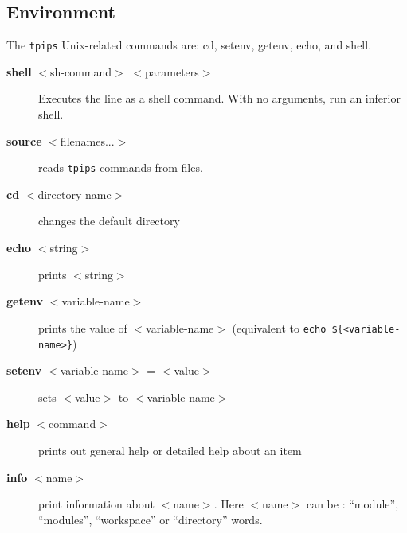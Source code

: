 \documentclass[a4paper,12pt]{article}
\begin{document}
\subsection{Environment}
The {\tt tpips} Unix-related commands are: cd, setenv, getenv, echo, and
shell.

\begin{description}
  
\item [ {\bf shell} $<$sh-command$>$ $<$parameters$>$] Executes the line
  as a shell command. With no arguments, run an inferior shell.
  
\item [ {\bf source} $<$filenames...$>$] reads {\tt tpips} commands from
  files.
  
\item [ {\bf cd} $<$directory-name$>$] changes the default directory
  

\item [ {\bf echo} $<$string$>$] prints $<$string$>$

\item [ {\bf getenv} $<$variable-name$>$] prints the value of
  $<$variable-name$>$ (equivalent to \verb+echo ${<variable-name>}+)
\item  [ {\bf setenv} $<$variable-name$>$ = $<$value$>$] sets $<$value$>$ to $<$variable-name$>$


\item [ {\bf help} $<$command$>$] prints out general help or detailed help
  about an item

\item [{\bf info} $<$name$>$]  print information about $<$name$>$. Here 
        $<$name$>$ can be :  ``module'', ``modules'', ``workspace'' or 
        ``directory'' words. 

\end{description}
  
\end{document}
